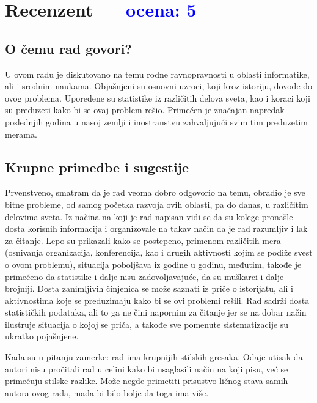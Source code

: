 \documentclass[a4paper]{report}
\newcommand{\odgovor}[1]{\textcolor{blue}{#1}}
\begin{document}
\chapter{Recenzent \odgovor{--- ocena: 5} }


\section{O čemu rad govori?}
U ovom radu je diskutovano na temu rodne ravnopravnosti u oblasti informatike, ali i srodnim naukama. Objašnjeni su osnovni uzroci, koji kroz istoriju, dovode do ovog problema. Upoređene su statistike iz različitih delova sveta, kao i koraci koji su preduzeti kako bi se ovaj problem rešio. Primećen je značajan napredak poslednjih godina u nasoj zemlji i inostranstvu zahvaljujući svim tim preduzetim merama.

\section{Krupne primedbe i sugestije}
Prvenstveno, smatram da je rad veoma dobro odgovorio na temu, obradio je sve bitne probleme, od samog početka razvoja ovih oblasti, pa do danas, u različitim delovima sveta. Iz načina na koji je rad napisan vidi se da su kolege pronašle dosta korisnih informacija i organizovale na takav način da je rad razumljiv i lak za čitanje. Lepo su prikazali kako se postepeno, primenom različitih mera (osnivanja organizacija, konferencija, kao i drugih aktivnosti kojim se podiže svest o ovom problemu), situacija poboljšava iz godine u godinu, međutim, takođe je primećeno da 
statistike i dalje nisu zadovoljavajuće, da su muškarci i dalje brojniji.
Dosta zanimljivih činjenica se može saznati iz priče o istorijatu, ali i aktivnostima koje se preduzimaju kako bi se ovi problemi rešili. Rad sadrži dosta statističkih podataka, ali to ga ne čini napornim za čitanje jer se na dobar način ilustruje situacija o kojoj se priča, a takođe sve pomenute sistematizacije su ukratko pojašnjene.

Kada su u pitanju zamerke: rad ima krupnijih stilskih gresaka. Odaje utisak da autori nisu pročitali rad u celini kako bi usaglasili način na koji pisu, već se primećuju stilske razlike. Može negde primetiti prisustvo ličnog stava samih autora ovog rada, mada bi bilo bolje da toga ima više. 
\end{document}
